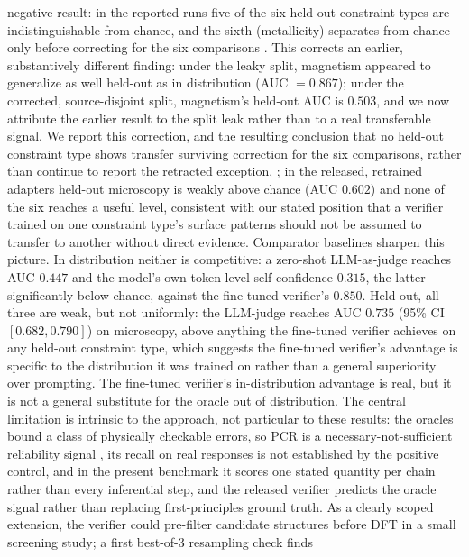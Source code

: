 \documentclass[pdflatex,sn-nature]{sn-jnl}
\newcommand{\rev}[1]{#1} %
\newcommand{\rev}[1]{{\color{blue}#1}} %
\providecommand{\DIFadd}[1]{{\protect\color{blue} \sf #1}} %
\providecommand{\DIFdel}[1]{{\protect\color{red} \scriptsize #1}} %
\providecommand{\DIFaddbegin}{} %
\providecommand{\DIFaddend}{} %
\providecommand{\DIFdelbegin}{} %
\providecommand{\DIFdelend}{} %
\providecommand{\DIFscaledelfig}{0.5}
\newlength{\DIFdelgraphicswidth} %
\newlength{\DIFdelgraphicsheight} %
\providecommand{\DIFaddincludegraphics}[2][]{{\color{blue}\fbox{\DIFOincludegraphics[#1]{#2}}}} %
\providecommand{\DIFdelincludegraphics}[2][]{%
\sbox{\DIFdelgraphicsbox}{\DIFOincludegraphics[#1]{#2}}%
\settoboxwidth{\DIFdelgraphicswidth}{\DIFdelgraphicsbox} %
\settoboxtotalheight{\DIFdelgraphicsheight}{\DIFdelgraphicsbox} %
\scalebox{\DIFscaledelfig}{%
\parbox[b]{\DIFdelgraphicswidth}{\usebox{\DIFdelgraphicsbox}\\[-\baselineskip] \rule{\DIFdelgraphicswidth}{0em}}\llap{\resizebox{\DIFdelgraphicswidth}{\DIFdelgraphicsheight}{%
\setlength{\unitlength}{\DIFdelgraphicswidth}%
\begin{picture}(1,1)%
\thicklines\linethickness{2pt} %
{\color[rgb]{1,0,0}\put(0,0){\framebox(1,1){}}}%
{\color[rgb]{1,0,0}\put(0,0){\line( 1,1){1}}}%
{\color[rgb]{1,0,0}\put(0,1){\line(1,-1){1}}}%
\end{picture}%
}\hspace*{3pt}}} %
} %
\DeclareRobustCommand{\DIFaddbegin}{\DIFOaddbegin \let\includegraphics\DIFaddincludegraphics} %
\DeclareRobustCommand{\DIFaddend}{\DIFOaddend \let\includegraphics\DIFOincludegraphics} %
\DeclareRobustCommand{\DIFdelbegin}{\DIFOdelbegin \let\includegraphics\DIFdelincludegraphics} %
\DeclareRobustCommand{\DIFdelend}{\DIFOaddend \let\includegraphics\DIFOincludegraphics} %
\begin{document}
negative result: \DIFaddbegin \DIFadd{\rev{in the reported runs} }\DIFaddend five of the six held-out constraint types are indistinguishable from
chance, and the sixth (metallicity) separates from chance only before correcting for the
six comparisons\DIFdelbegin \DIFdel{.
This corrects an earlier, substantively different finding: under the leaky split, magnetism
appeared to generalize as well held-out as in distribution (AUC $=0.867$); under the
corrected, source-disjoint split, magnetism's held-out AUC is $0.503$, and we now attribute
the earlier result to the split leak rather than to a real transferable signal. We report
this correction, and the resulting conclusion that no held-out constraint type shows transfer
surviving correction for the six comparisons, rather than continue to report the
retracted exception, }\DIFdelend \DIFaddbegin \DIFadd{\rev{; in the released, retrained adapters held-out microscopy is weakly above chance
(AUC $0.602$) and none of the six reaches a useful level}, }\DIFaddend consistent with our stated position that a verifier trained on one
constraint type's surface patterns should not be assumed to transfer to another
without direct evidence. Comparator baselines sharpen this picture. In distribution
neither is competitive: a zero-shot LLM-as-judge reaches AUC $0.447$ and the model's own
token-level self-confidence $0.315$, the latter significantly below chance, against the
fine-tuned verifier's $0.850$. Held out, all three are weak, but not uniformly: the
LLM-judge reaches AUC $0.735$ (95\% CI $[0.682,0.790]$) on microscopy, above anything the
fine-tuned verifier achieves on any held-out constraint type, which suggests the fine-tuned
verifier's advantage is specific to the distribution it was trained on rather than a general
superiority over prompting. The \DIFdelbegin \DIFdel{fine-tuned verifier's in-distribution advantage is real, but it is
not a general substitute for the oracle out of distribution. The }\DIFdelend central limitation is intrinsic to the approach, not
particular to these results: the oracles bound a class of physically checkable
errors, so PCR is a necessary-not-sufficient reliability signal\DIFaddbegin \DIFadd{\rev{, its recall on real responses
is not established by the positive control, and in the present benchmark it scores one stated
quantity per chain rather than every inferential step}}\DIFaddend , and the released
verifier predicts the oracle signal rather than replacing first-principles ground
truth. As a clearly scoped extension, the verifier could pre-filter candidate
structures before DFT in a small screening study; a first best-of-3 resampling check finds
\end{document}
